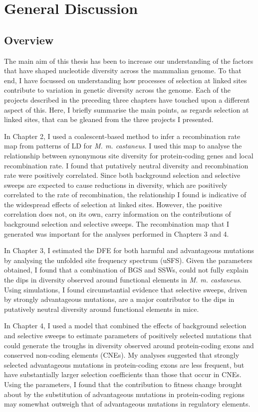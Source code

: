 \chapter{General Discussion}

\section{Overview}

	The main aim of this thesis has been to increase our understanding of the factors that have shaped nucleotide diversity across the mammalian genome. To that end, I have focussed on understanding how processes of selection at linked sites contribute to variation in genetic diversity across the genome. Each of the projects described in the preceding three chapters have touched upon a different aspect of this. Here, I briefly summarise the main points, as regards selection at linked sites, that can be gleaned from the three projects I presented.

	In Chapter 2, I used a coalescent-based method to infer a recombination rate map from patterns of LD for \textit{M. m. castaneus}. I used this map to analyse the relationship between synonymous site diversity for protein-coding genes and local recombination rate. I found that putatively neutral diversity and recombination rate were positively correlated. Since both background selection and selective sweeps are expected to cause reductions in diversity, which are positively correlated to the rate of recombination, the relationship I found is indicative of the widespread effects of selection at linked sites. However, the positive correlation does not, on its own, carry information on the contributions of background selection and selective sweeps. The recombination map that I generated was important for the analyses performed in Chapters 3 and 4.
	
	In Chapter 3, I estimated the DFE for both harmful and advantageous mutations by analysing the unfolded site frequency spectrum (uSFS). Given the parameters obtained, I found that a combination of BGS and SSWs, could not fully explain the dips in diversity observed around functional elements in \textit{M. m. castaneus}. Using simulations, I found circumstantial evidence that selective sweeps, driven by strongly advantageous mutations, are a major contributor to the dips in putatively neutral diversity around functional elements in mice.

	In Chapter 4, I used a model that combined the effects of background selection and selective sweeps to estimate parameters of positively selected mutations that could generate the troughs in diversity observed around protein-coding exons and conserved non-coding elements (CNEs). My analyses suggested that strongly selected advantageous mutations in protein-coding exons are less frequent, but have substantially larger selection coefficients than those that occur in CNEs. Using the parameters, I found that the contribution to fitness change brought about by the substitution of advantageous mutations in protein-coding regions may somewhat outweigh that of advantageous mutations in regulatory elements.

